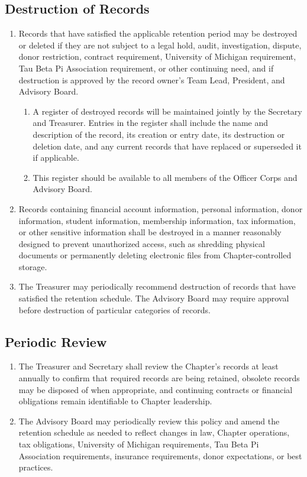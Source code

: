 \subsection{Destruction of Records} \label{XII.11}
\begin{enumerate}
    \item {} Records that have satisfied the applicable retention period may be destroyed or deleted if they are not subject to a legal hold, 
    audit, investigation, dispute, donor restriction, contract requirement, University of Michigan requirement, Tau Beta Pi Association requirement, or other continuing need, 
    and if destruction is approved by the record owner’s Team Lead, President, and Advisory Board.
    \begin{enumerate}
        \item A register of destroyed records will be maintained jointly by the Secretary and Treasurer. Entries in the register shall include the name and description of the record, 
        its creation or entry date, its destruction or deletion date, and any current records that have replaced or superseded it if applicable.
        \item This register should be available to all members of the Officer Corps and Advisory Board.
    \end{enumerate}
    \item {} Records containing financial account information, personal information, donor information, student information, 
    membership information, tax information, or other sensitive information shall be destroyed in a manner reasonably designed to prevent unauthorized access, 
    such as shredding physical documents or permanently deleting electronic files from Chapter-controlled storage.
    \item {} The Treasurer may periodically recommend destruction of records that have satisfied the retention schedule. 
    The Advisory Board may require approval before destruction of particular categories of records.
\end{enumerate}

\subsection{Periodic Review} \label{XII.12}
\begin{enumerate}
    \item {} The Treasurer and Secretary shall review the Chapter’s records at least annually to confirm that required records are being retained, 
    obsolete records may be disposed of when appropriate, and continuing contracts or financial obligations remain identifiable to Chapter leadership.
    \item {} The Advisory Board may periodically review this policy and amend the retention schedule as needed to reflect changes in law, 
    Chapter operations, tax obligations, University of Michigan requirements, Tau Beta Pi Association requirements, insurance requirements, donor expectations, or best practices.
\end{enumerate}